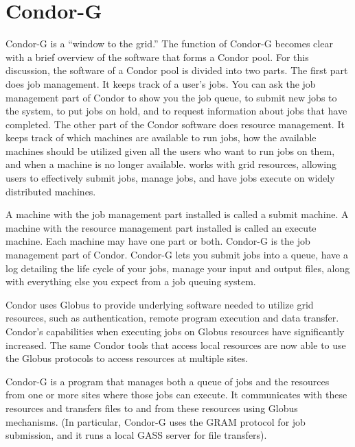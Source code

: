 \section{\label{sec:Condor-G}Condor-G}

Condor-G is a ``window to the grid.''
The function of Condor-G becomes clear
with a brief overview of the software that forms a Condor pool.
For this discussion, the software of a Condor pool is divided
into two parts.
The first part does job management.
It keeps track of a user's jobs.
You can ask the job management part of Condor to show
you the job queue, to submit new jobs to the system,
to put jobs on hold,
and to request information about jobs that have completed.
The other part of the Condor software
does resource management.
It keeps track of which machines are available to run jobs,
how the available machines should be utilized given all the users
who want to run jobs on them,
and when a machine is no longer available.
works with grid resources, allowing users to
effectively submit jobs, manage jobs, and have jobs execute
on widely distributed machines.

A machine with the job management part installed
is called a submit machine.
A machine with the resource management part installed 
is called an execute machine.
Each machine may have one part or both.
Condor-G is the job management part of Condor.
Condor-G lets you submit jobs into a queue,
have a log detailing the life cycle of your jobs,
manage your input and output files,
along with everything else you expect from a job queuing system.

Condor uses 
Globus to provide underlying software needed to utilize
grid resources, such as authentication, remote program
execution and data transfer.
Condor's capabilities when executing jobs on Globus resources have
significantly increased.
The same Condor tools that access local resources 
are now able to use the Globus protocols to access resources at multiple
sites. 

Condor-G is a program that manages both a queue of jobs
and the resources from one or more sites where those jobs can execute. 
It communicates with these resources and transfers files
to and from these resources using Globus mechanisms.
(In particular, Condor-G uses the GRAM protocol for job submission,
and it runs a local GASS server for file transfers).

